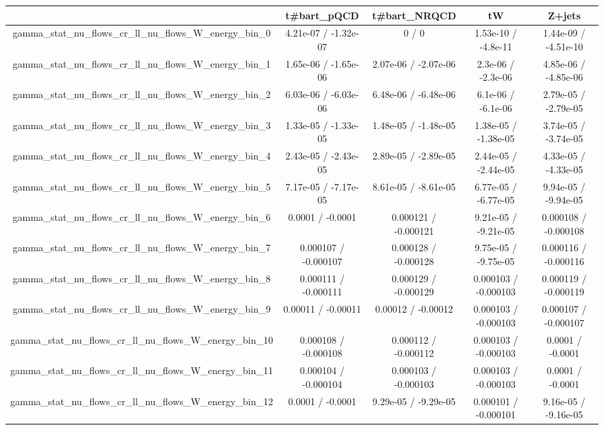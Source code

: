 \documentclass[10pt]{article}
\begin{document}
\begin{table}[htbp]
\begin{center}
\begin{tabular}{|c|c|c|c|c|}
\hline 
      & t#bar{t}_{pQCD}      & t#bar{t}_{NRQCD}      & tW      & Z+jets \\ 
\hline 
  gamma_stat_nu_flows_cr_ll_nu_flows_W_energy_bin_0 & 4.21e-07 / -1.32e-07 & 0 / 0 & 1.53e-10 / -4.8e-11 & 1.44e-09 / -4.51e-10 \\ 
  gamma_stat_nu_flows_cr_ll_nu_flows_W_energy_bin_1 & 1.65e-06 / -1.65e-06 & 2.07e-06 / -2.07e-06 & 2.3e-06 / -2.3e-06 & 4.85e-06 / -4.85e-06 \\ 
  gamma_stat_nu_flows_cr_ll_nu_flows_W_energy_bin_2 & 6.03e-06 / -6.03e-06 & 6.48e-06 / -6.48e-06 & 6.1e-06 / -6.1e-06 & 2.79e-05 / -2.79e-05 \\ 
  gamma_stat_nu_flows_cr_ll_nu_flows_W_energy_bin_3 & 1.33e-05 / -1.33e-05 & 1.48e-05 / -1.48e-05 & 1.38e-05 / -1.38e-05 & 3.74e-05 / -3.74e-05 \\ 
  gamma_stat_nu_flows_cr_ll_nu_flows_W_energy_bin_4 & 2.43e-05 / -2.43e-05 & 2.89e-05 / -2.89e-05 & 2.44e-05 / -2.44e-05 & 4.33e-05 / -4.33e-05 \\ 
  gamma_stat_nu_flows_cr_ll_nu_flows_W_energy_bin_5 & 7.17e-05 / -7.17e-05 & 8.61e-05 / -8.61e-05 & 6.77e-05 / -6.77e-05 & 9.94e-05 / -9.94e-05 \\ 
  gamma_stat_nu_flows_cr_ll_nu_flows_W_energy_bin_6 & 0.0001 / -0.0001 & 0.000121 / -0.000121 & 9.21e-05 / -9.21e-05 & 0.000108 / -0.000108 \\ 
  gamma_stat_nu_flows_cr_ll_nu_flows_W_energy_bin_7 & 0.000107 / -0.000107 & 0.000128 / -0.000128 & 9.75e-05 / -9.75e-05 & 0.000116 / -0.000116 \\ 
  gamma_stat_nu_flows_cr_ll_nu_flows_W_energy_bin_8 & 0.000111 / -0.000111 & 0.000129 / -0.000129 & 0.000103 / -0.000103 & 0.000119 / -0.000119 \\ 
  gamma_stat_nu_flows_cr_ll_nu_flows_W_energy_bin_9 & 0.00011 / -0.00011 & 0.00012 / -0.00012 & 0.000103 / -0.000103 & 0.000107 / -0.000107 \\ 
  gamma_stat_nu_flows_cr_ll_nu_flows_W_energy_bin_10 & 0.000108 / -0.000108 & 0.000112 / -0.000112 & 0.000103 / -0.000103 & 0.0001 / -0.0001 \\ 
  gamma_stat_nu_flows_cr_ll_nu_flows_W_energy_bin_11 & 0.000104 / -0.000104 & 0.000103 / -0.000103 & 0.000103 / -0.000103 & 0.0001 / -0.0001 \\ 
  gamma_stat_nu_flows_cr_ll_nu_flows_W_energy_bin_12 & 0.0001 / -0.0001 & 9.29e-05 / -9.29e-05 & 0.000101 / -0.000101 & 9.16e-05 / -9.16e-05 \\ 

\end{tabular}
\end{center}
\end{table}
\end{document}
